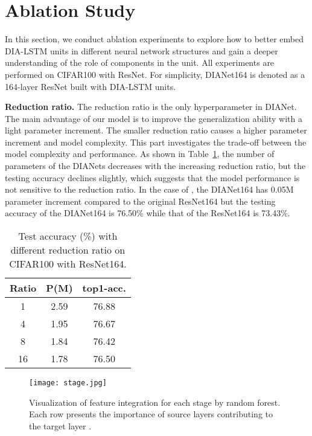 \documentclass[letterpaper]{article} \usepackage{aaai20}  \usepackage{times}  \usepackage{helvet} \usepackage{courier}  \usepackage[hyphens]{url}  \usepackage{graphicx} \urlstyle{rm} \def\UrlFont{\rm}  \usepackage{graphicx}  \frenchspacing  \setlength{\pdfpagewidth}{8.5in}  \setlength{\pdfpageheight}{11in}  \usepackage{color}
\begin{document}
	\section{Ablation Study}
	\label{ablationstudy}
	In this section, we conduct ablation experiments to explore how to better embed DIA-LSTM units in different neural network structures and gain a deeper understanding of the role of components in the unit. All experiments are performed on CIFAR100 with ResNet. For simplicity, DIANet164 is denoted as a 164-layer ResNet built with DIA-LSTM units.	
	
	\noindent\textbf{Reduction ratio.} The reduction ratio is the only hyperparameter in DIANet. The main advantage of our model is to improve the generalization ability with a light parameter increment. The smaller reduction ratio causes a higher parameter increment and model complexity. This part investigates the trade-off between the model complexity and performance. As shown in Table~\ref{tab:reduction ratio}, the number of parameters of the DIANets decreases with the increasing reduction ratio, but the testing accuracy declines slightly, which suggests that the model performance is not sensitive to the reduction ratio. In the case of , the DIANet164 has 0.05M parameter increment compared to the original ResNet164 but the testing accuracy of the DIANet164 is 76.50\% while that of the ResNet164 is 73.43\%. 
	\begin{table}[htbp]
	    \centering
	\small
			\centering
			\begin{tabular}{|c|c|c|}
				\midrule
				Ratio  & P(M) & top1-acc. \\
				\midrule
				1  & 2.59 & 76.88  \\
				4  & 1.95  & 76.67  \\
				8  & 1.84  & 76.42  \\
				16  & 1.78  & 76.50  \\
				\bottomrule
			\end{tabular}\caption{Test accuracy (\%) with different reduction ratio on CIFAR100 with ResNet164.}
			\label{tab:reduction ratio}\end{table}{}
	\begin{figure*}[h]

		\centering
		\texttt{[image: stage.jpg]}
		\caption{Visualization of feature integration for each stage by random forest. Each row presents the importance of source layers  contributing to the target layer .}
		\label{features integration for each stage}
	\end{figure*}
	
\end{document}

